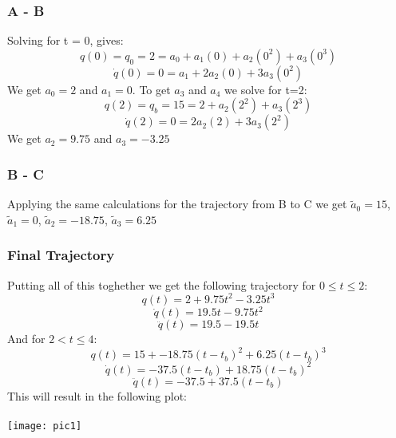 \documentclass{article}
\begin{document}
	\subsubsection{A - B}
	Solving for t = 0, gives:
	\begin{equation}
	q(0)=q_0=2 = a_0 +a_1(0)+a_2(0^2)+a_3(0^3)
	\end{equation}
	\begin{equation}
	\dot{q}(0) = 0=a_1+2a_2(0)+3a_3(0^2)
	\end{equation}
	We get $a_0=2$ and $a_1=0$. To get $a_3$ and $a_4$ we solve for t=2:
	\begin{equation}
	q(2)=q_b=15=2+a_2(2^2)+a_3(2^3)
	\end{equation}
	\begin{equation}
	\dot{q}(2)=0=2a_2(2)+3a_3(2^2)
	\end{equation}
	We get $a_2=9.75$ and $ a_3=-3.25$
	\subsubsection{B - C}
	Applying the same calculations for the trajectory from B to C we get $\tilde{a}_0=15$, $\tilde{a}_1=0$, $\tilde{a}_2=-18.75$, $\tilde{a}_3=6.25$
	\subsubsection{Final Trajectory}
	Putting all of this toghether we get the following trajectory for $0\leq t\leq 2$:
	 \begin{equation}
	q(t) = 2+9.75t^2-3.25t^3
	\end{equation}
	\begin{equation}
	\dot{q}(t) = 19.5t-9.75t^2
	\end{equation}
	\begin{equation}
	\ddot{q}(t) = 19.5-19.5t
	\end{equation}
	And for $2 < t \leq 4$:
	\begin{equation}
	q(t) = 15+-18.75(t-t_b)^2+6.25(t-t_b)^3
	\end{equation}
	\begin{equation}
	\dot{q}(t) = -37.5(t-t_b)+18.75(t-t_b)^2
	\end{equation}
	\begin{equation}
	\ddot{q}(t) = -37.5+37.5(t-t_b)
	\end{equation}
	This will result in the following plot:\\\\
	\texttt{[image: pic1]} 
	\newpage
\end{document}
